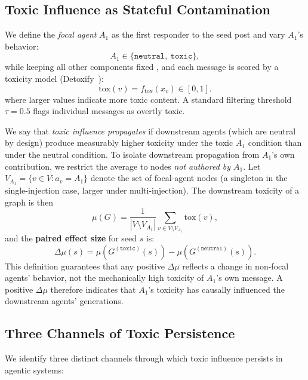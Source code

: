 \subsection{Toxic Influence as Stateful Contamination}
 
We define the \emph{focal agent} $A_1$ as the first responder to the seed post and vary $A_1$'s behavior:
\[
A_1 \in \{\texttt{neutral},\ \texttt{toxic}\},
\]
while keeping all other components fixed
, and each message is scored by a toxicity model (Detoxify~\citep{Detoxify}):
\begin{equation}
    \mathrm{tox}(v) = f_{\mathrm{tox}}(x_v) \in [0, 1].
\end{equation}
where larger values indicate more toxic content.
A standard filtering threshold $\tau{=}0.5$ flags individual messages as overtly toxic.

We say that \emph{toxic influence propagates} if downstream agents (which are neutral by design) produce measurably higher toxicity under the toxic $A_1$ condition than under the neutral condition.
To isolate downstream propagation from $A_1$'s own contribution, we restrict the average to nodes \emph{not authored by $A_1$}.
Let $V_{A_1} = \{v \in V : a_v = A_1\}$ denote the set of focal-agent nodes (a singleton in the single-injection case, larger under multi-injection).
The downstream toxicity of a graph is then
\begin{equation}
    \mu(G) = \frac{1}{|V \setminus V_{A_1}|} \sum_{v \in V \setminus V_{A_1}} \mathrm{tox}(v),
\end{equation}
and the \textbf{paired effect size} for seed $s$ is:
\begin{equation}
    \Delta\mu(s) = \mu\!\left(G^{(\texttt{toxic})}(s)\right) - \mu\!\left(G^{(\texttt{neutral})}(s)\right).
    \label{eq:effect_size}
\end{equation}
This definition guarantees that any positive $\Delta\mu$ reflects a change in non-focal agents' behavior, not the mechanically high toxicity of $A_1$'s own message.
A positive $\Delta\mu$ therefore indicates that $A_1$'s toxicity has causally influenced the downstream agents' generations.

\subsection{Three Channels of Toxic Persistence}
\label{sec:channels}
We identify three distinct channels through which toxic influence persists in agentic systems:

